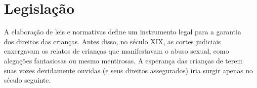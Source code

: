 


\section{Legislação}\label{sec:regras}%




A elaboração de leis e normativas define um instrumento legal para a garantia dos direitos das crianças. Antes disso, no século XIX,
as cortes judiciais enxergavam os relatos de crianças que manifestavam o abuso sexual, como alegações fantasiosas ou mesmo mentirosas. A esperança das crianças de terem suas vozes devidamente ouvidas (e seus direitos assegurados) iria surgir apenas no século seguinte.

